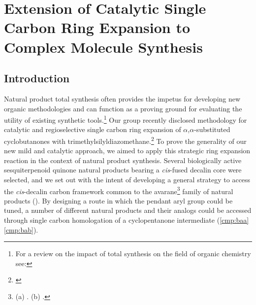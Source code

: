 \captionsetup[figure]{list=no} %

 \chapter{Extension of Catalytic Single Carbon Ring Expansion to Complex
 Molecule Synthesis}
 \label{chp:singlecarbon}
 \pagebreak
 
\section{Introduction} 
\doublespacing 
Natural product total synthesis
often provides the impetus for developing new organic methodologies and can
function as a proving ground for evaluating the utility of existing synthetic
tools.\footnote{For a review on the impact of total synthesis on the
field of organic chemistry see: } Our group recently disclosed methodology for catalytic
and regioselective single carbon ring expansion of $\alpha$,$\alpha$-substituted
cyclobutanones with
trimethylsilyldiazomethane.\footnote{
\label{ref:cdabrowski}} To prove the generality of our new mild and catalytic approach, we aimed to
apply this strategic ring expansion reaction in the context of natural product synthesis. Several biologically active sesquiterpenoid quinone natural products
bearing a \textit{cis}-fused decalin core were selected, and we set out with the
intent of developing a general strategy to access the \textit{cis}-decalin
carbon framework common to the avarane\footnote{(a) . (b) .} family of natural products (). By designing a
route in which the pendant aryl group could be tuned, a number of different natural products and
their analogs could be accessed through single carbon homologation of a cyclopentanone intermediate
(\ref{cmp:baa}\ce{->}\ref{cmp:bab}). 

